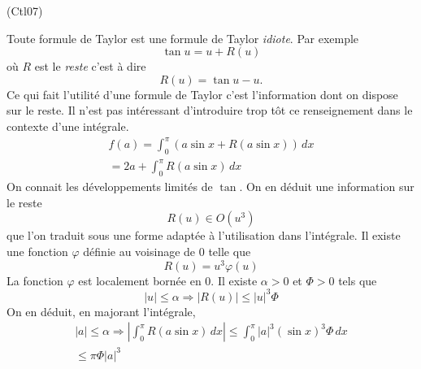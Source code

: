 \begin{tiny}(Ctl07)\end{tiny} Toute formule de Taylor est une formule de Taylor \emph{idiote}. Par exemple
\begin{displaymath}
  \tan u = u + R(u)
\end{displaymath}
où $R$ est le \emph{reste} c'est à dire
\begin{displaymath}
  R(u) = \tan u -u.
\end{displaymath}
Ce qui fait l'utilité d'une formule de Taylor c'est l'information dont on dispose sur le reste. Il n'est pas intéressant d'introduire trop tôt ce renseignement dans le contexte d'une intégrale.
\begin{multline*}
  f(a) = \int_{0}^{\pi}\left( a\sin x + R(a\sin x)\right)\,dx \\
  = 2a + \int_{0}^{\pi}R(a\sin x)\,dx
\end{multline*}
On connait les développements limités de $\tan$. On en déduit une information sur le reste
\begin{displaymath}
  R(u) \in O(u^3)
\end{displaymath}
que l'on traduit sous une forme adaptée à l'utilisation dans l'intégrale. Il existe une fonction $\varphi$ définie au voisinage de $0$ telle que 
\begin{displaymath}
  R(u) = u^3 \varphi(u)
\end{displaymath}
La fonction $\varphi$ est localement bornée en $0$. Il existe $\alpha>0$ et $\Phi>0$ tels que
\begin{displaymath}
  |u|\leq \alpha \Rightarrow |R(u)|\leq |u|^3 \Phi
\end{displaymath}
On en déduit, en majorant l'intégrale,
\begin{multline*}
  |a|\leq \alpha \Rightarrow \left|\int_{0}^{\pi}R(a\sin x)\,dx\right| 
  \leq \int_{0}^{\pi}|a|^3(\sin x)^3 \Phi\,dx\\
  \leq \pi \Phi |a|^3
\end{multline*}

